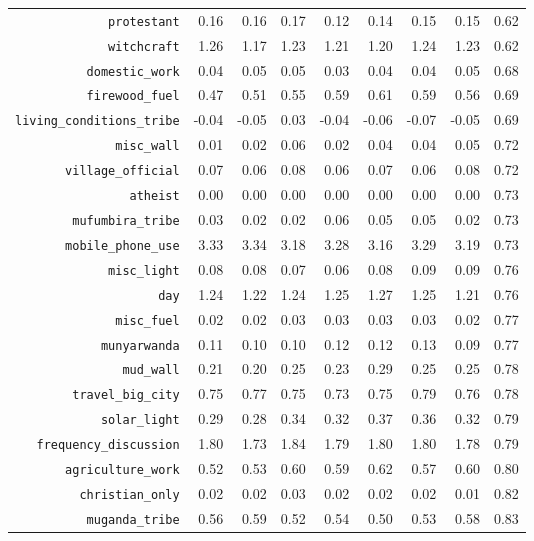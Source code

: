 \begin{longtable}{rrrrrrrrr}
  {\texttt{protestant}} & 0.16 & 0.16 & 0.17 & 0.12 & 0.14 & 0.15 & 0.15 & 0.62 \\ 
  {\texttt{witchcraft}} & 1.26 & 1.17 & 1.23 & 1.21 & 1.20 & 1.24 & 1.23 & 0.62 \\ 
  {\texttt{domestic\_work}} & 0.04 & 0.05 & 0.05 & 0.03 & 0.04 & 0.04 & 0.05 & 0.68 \\ 
  {\texttt{firewood\_fuel}} & 0.47 & 0.51 & 0.55 & 0.59 & 0.61 & 0.59 & 0.56 & 0.69 \\ 
  {\texttt{living\_conditions\_tribe}} & -0.04 & -0.05 & 0.03 & -0.04 & -0.06 & -0.07 & -0.05 & 0.69 \\ 
  {\texttt{misc\_wall}} & 0.01 & 0.02 & 0.06 & 0.02 & 0.04 & 0.04 & 0.05 & 0.72 \\ 
  {\texttt{village\_official}} & 0.07 & 0.06 & 0.08 & 0.06 & 0.07 & 0.06 & 0.08 & 0.72 \\ 
  {\texttt{atheist}} & 0.00 & 0.00 & 0.00 & 0.00 & 0.00 & 0.00 & 0.00 & 0.73 \\ 
  {\texttt{mufumbira\_tribe}} & 0.03 & 0.02 & 0.02 & 0.06 & 0.05 & 0.05 & 0.02 & 0.73 \\ 
  {\texttt{mobile\_phone\_use}} & 3.33 & 3.34 & 3.18 & 3.28 & 3.16 & 3.29 & 3.19 & 0.73 \\ 
  {\texttt{misc\_light}} & 0.08 & 0.08 & 0.07 & 0.06 & 0.08 & 0.09 & 0.09 & 0.76 \\ 
  {\texttt{day}} & 1.24 & 1.22 & 1.24 & 1.25 & 1.27 & 1.25 & 1.21 & 0.76 \\ 
  {\texttt{misc\_fuel}} & 0.02 & 0.02 & 0.03 & 0.03 & 0.03 & 0.03 & 0.02 & 0.77 \\ 
  {\texttt{munyarwanda}} & 0.11 & 0.10 & 0.10 & 0.12 & 0.12 & 0.13 & 0.09 & 0.77 \\ 
  {\texttt{mud\_wall}} & 0.21 & 0.20 & 0.25 & 0.23 & 0.29 & 0.25 & 0.25 & 0.78 \\ 
  {\texttt{travel\_big\_city}} & 0.75 & 0.77 & 0.75 & 0.73 & 0.75 & 0.79 & 0.76 & 0.78 \\ 
  {\texttt{solar\_light}} & 0.29 & 0.28 & 0.34 & 0.32 & 0.37 & 0.36 & 0.32 & 0.79 \\ 
  {\texttt{frequency\_discussion}} & 1.80 & 1.73 & 1.84 & 1.79 & 1.80 & 1.80 & 1.78 & 0.79 \\ 
  {\texttt{agriculture\_work}} & 0.52 & 0.53 & 0.60 & 0.59 & 0.62 & 0.57 & 0.60 & 0.80 \\ 
  {\texttt{christian\_only}} & 0.02 & 0.02 & 0.03 & 0.02 & 0.02 & 0.02 & 0.01 & 0.82 \\ 
  {\texttt{muganda\_tribe}} & 0.56 & 0.59 & 0.52 & 0.54 & 0.50 & 0.53 & 0.58 & 0.83 \\ 

\end{longtable}
